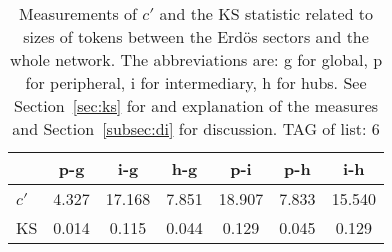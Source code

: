 \begin{table}[h!]
\begin{center}
	\caption{Measurements of $c'$ and the KS statistic related to sizes of tokens between the Erd\"os sectors and the whole network. The abbreviations are: g for global, p for peripheral, i for intermediary, h for hubs. See Section~\ref{sec:ks} for and explanation of the measures and Section~\ref{subsec:di} for discussion. TAG of list: 6}
\label{tab:kolTok}
\begin{tabular}{l | c c c c c c}
{\bf } & {\bf p-g} & {\bf i-g} & {\bf h-g} & {\bf p-i} & {\bf p-h} & {\bf i-h} \\\hline
$c'$ & 4.327  & 17.168  & 7.851  & 18.907  & 7.833  & 15.540 \\
KS & 0.014  & 0.115  & 0.044  & 0.129  & 0.045  & 0.129 \\
\end{tabular}
\end{center}
\end{table}
